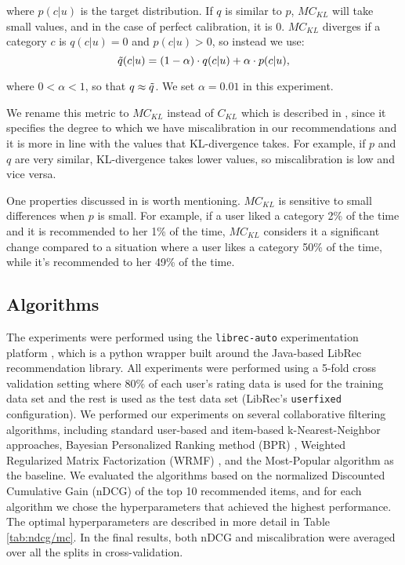 where $p(c|u)$ is the target distribution. If $q$ is similar to $p$, $MC_{KL}$ will take small values, and in the case of perfect calibration, it is 0. $MC_{KL}$ diverges if a category $c$ is $q(c|u)=0$ and $p(c|u)>0$, so instead we use:
\begin{equation}
    \Tilde{q}(c|u) = (1 - \alpha) \cdot q(c|u) + \alpha \cdot p(c|u),
\end{equation}

where $0 < \alpha < 1$, so that $q \approx \Tilde{q}$. We set $\alpha = 0.01$ in this experiment.

We rename this metric to $MC_{KL}$ instead of $C_{KL}$ which is described in \cite{steck2018calibrated}, since it specifies the degree to which we have miscalibration in our recommendations and it is more in line with the values that KL-divergence takes. For example, if $p$ and $q$ are very similar, KL-divergence takes lower values, so miscalibration is low and vice versa.

One properties discussed in \cite{steck2018calibrated} is worth mentioning. $MC_{KL}$ is sensitive to small differences when $p$ is small. For example, if a user liked a category 2\% of the time and it is recommended to her 1\% of the time, $MC_{KL}$ considers it a significant change compared to a situation where a user likes a category 50\% of the time, while it's recommended to her 49\% of the time. 

\subsection{Algorithms} 

The experiments were performed using the \texttt{librec-auto} experimentation platform \cite{10.1145/3351095.3375670}, which is a python wrapper built around the Java-based LibRec \cite{guo2015librec} recommendation library. All experiments were performed using a 5-fold cross validation setting where 80\% of each user's rating data is used for the training data set and the rest is used as the test data set (LibRec's \texttt{userfixed} configuration).
We performed our experiments on several collaborative filtering algorithms, including standard user-based and item-based k-Nearest-Neighbor approaches, Bayesian Personalized Ranking method (BPR) \cite{rendle2009bpr}, Weighted Regularized Matrix Factorization (WRMF) \cite{hu2008collaborative}, and the Most-Popular algorithm as the baseline. We evaluated the algorithms based on the normalized Discounted Cumulative Gain (nDCG) of the top 10 recommended items, and for each algorithm we chose the hyperparameters that achieved the highest performance. The optimal hyperparameters are described in more detail in Table \ref{tab:ndcg/mc}. In the final results, both nDCG and miscalibration were averaged over all the splits in cross-validation.


